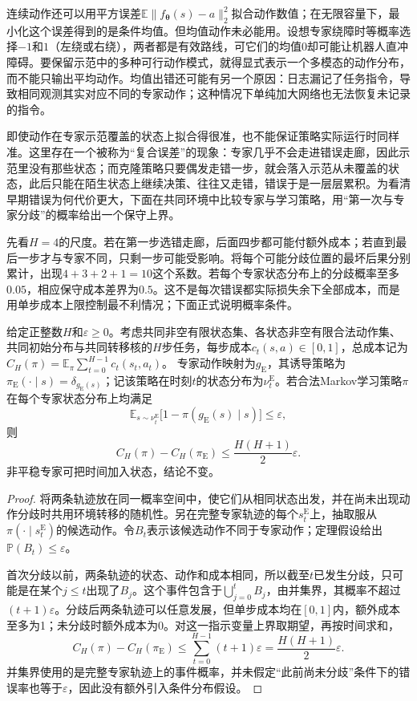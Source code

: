 连续动作还可以用平方误差$\mathbb E\lVert f_{\bm\theta}(s)-a\rVert_2^2$拟合动作数值；在无限容量下，最小化这个误差得到的是条件均值。但均值动作未必能用。设想专家绕障时等概率选择$-1$和$1$（左绕或右绕），两者都是有效路线，可它们的均值$0$却可能让机器人直冲障碍。要保留示范中的多种可行动作模式，就得显式表示一个多模态的动作分布，而不能只输出平均动作。均值出错还可能有另一个原因：日志漏记了任务指令，导致相同观测其实对应不同的专家动作；这种情况下单纯加大网络也无法恢复未记录的指令。

即使动作在专家示范覆盖的状态上拟合得很准，也不能保证策略实际运行时同样准。这里存在一个被称为“复合误差”的现象：专家几乎不会走进错误走廊，因此示范里没有那些状态；而克隆策略只要偶发走错一步，就会落入示范从未覆盖的状态，此后只能在陌生状态上继续决策、往往又走错，错误于是一层层累积。为看清早期错误为何代价更大，下面在共同环境中比较专家与学习策略，用“第一次与专家分歧”的概率给出一个保守上界。

先看$H=4$的尺度。若在第一步选错走廊，后面四步都可能付额外成本；若直到最后一步才与专家不同，只剩一步可能受影响。将每个可能分歧位置的最坏后果分别累计，出现$4+3+2+1=10$这个系数。若每个专家状态分布上的分歧概率至多$0.05$，相应保守成本差界为$0.5$。这不是每次错误都实际损失余下全部成本，而是用单步成本上限控制最不利情况；下面正式说明概率条件。

\begin{theorem}[行为克隆的首次分歧界]
  \label{thm:rl-reward-bc}
  给定正整数$H$和$\varepsilon\geq0$。考虑共同非空有限状态集、各状态非空有限合法动作集、共同初始分布与共同转移核的$H$步任务，每步成本$c_t(s,a)\in[0,1]$，总成本记为
  $C_H(\pi)=\mathbb E_\pi\sum_{t=0}^{H-1}c_t(s_t,a_t)$。
  专家动作映射为$g_{\mathrm E}$，其诱导策略为$\pi_{\mathrm E}(\cdot\mid s)=\delta_{g_{\mathrm E}(s)}$；记该策略在时刻$t$的状态分布为$\nu_t^{\mathrm E}$。若合法Markov学习策略$\pi$在每个专家状态分布上均满足
  \[
    \mathbb E_{s\sim\nu_t^{\mathrm E}}
    \bigl[1-\pi(g_{\mathrm E}(s)\mid s)\bigr]\leq\varepsilon,
  \]
  则
  \[
    C_H(\pi)-C_H(\pi_{\mathrm E})
    \leq \frac{H(H+1)}2\varepsilon.
  \]
  非平稳专家可把时间加入状态，结论不变。
\end{theorem}

\begin{proof}
  将两条轨迹放在同一概率空间中，使它们从相同状态出发，并在尚未出现动作分歧时共用环境转移的随机性。另在完整专家轨迹的每个$s_t^{\mathrm E}$上，抽取服从$\pi(\cdot\mid s_t^{\mathrm E})$的候选动作。令$B_t$表示该候选动作不同于专家动作；定理假设给出$\mathbb P(B_t)\leq\varepsilon$。

  首次分歧以前，两条轨迹的状态、动作和成本相同，所以截至$t$已发生分歧，只可能是在某个$j\leq t$出现了$B_j$。这个事件包含于$\bigcup_{j=0}^{t}B_j$，由并集界，其概率不超过$(t+1)\varepsilon$。分歧后两条轨迹可以任意发展，但单步成本均在$[0,1]$内，额外成本至多为1；未分歧时额外成本为0。对这一指示变量上界取期望，再按时间求和，
  \[
    C_H(\pi)-C_H(\pi_{\mathrm E})
    \leq\sum_{t=0}^{H-1}(t+1)\varepsilon
    =\frac{H(H+1)}2\varepsilon.
  \]
  并集界使用的是完整专家轨迹上的事件概率，并未假定“此前尚未分歧”条件下的错误率也等于$\varepsilon$，因此没有额外引入条件分布假设。
\end{proof}

